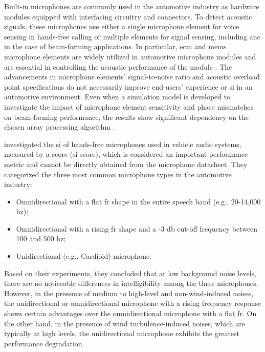 Built-in microphones are commonly used in the automotive industry as hardware modules equipped with interfacing circuitry and connectors. To detect acoustic signals, these microphones use either a single microphone element for voice sensing in hands-free calling or multiple elements for signal sensing, including \gls{anc} in the case of beam-forming applications. In particular, \gls{ecm} and \gls{mems} microphone elements are widely utilized in automotive microphone modules and are essential in controlling the acoustic performance of the module \cite{Aubauer2001}. The advancements in microphone elements' signal-to-noise ratio and acoustic overload point specifications do not necessarily improve end-users' experience or \gls{si} in an automotive environment. Even when a simulation model is developed to investigate the impact of microphone element sensitivity and phase mismatches on beam-forming performance, the results show significant dependency on the chosen array processing algorithm \cite{Du2019}. 

\textcite{Du2022} investigated the \gls{si} of hands-free microphones used in vehicle audio systems, measured by a score (\gls{si} score), which is considered an important performance metric and cannot be directly obtained from the microphone datasheet. They categorized the three most common microphone types in the automotive industry:

\begin{itemize}
    \item Omnidirectional with a flat \gls{fr} shape in the entire speech band (e.g., 20-14,000 \gls{hz});
    \item Omnidirectional with a rising \gls{fr} shape and a -3 \gls{db} cut-off frequency between 100 and 500 \gls{hz};
    \item Unidirectional (e.g., Cardioid) microphone.   
\end{itemize}

Based on their experiments, they concluded that at low background noise levels, there are no noticeable differences in intelligibility among the three microphones. However, in the presence of medium to high-level and non-wind-induced noises, the unidirectional or omnidirectional microphone with a rising frequency response shows certain advantages over the omnidirectional microphone with a flat \gls{fr}. On the other hand, in the presence of wind turbulence-induced noises, which are typically at high levels, the unidirectional microphone exhibits the greatest performance degradation.


